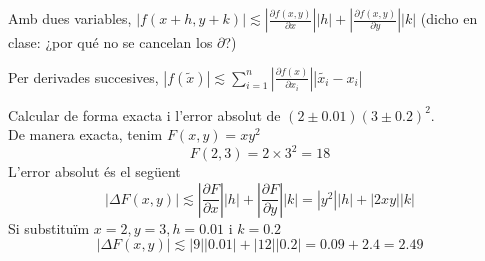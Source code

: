 \documentclass[../main.tex]{subfiles}
\begin{document}
    \begin{definicio}
        Amb dues variables, $\left\lvert f(x+h, y+k) \right\rvert \lesssim \left\lvert \frac{\partial f\left( x,y \right)}{\partial x} \right\rvert\left\lvert h \right\rvert + \left\lvert \frac{\partial f\left( x,y \right)}{\partial y} \right\rvert\left\lvert k \right\rvert$
        (dicho en clase: ¿por qué no se cancelan los $\partial$?)
    \end{definicio}
    \begin{definicio}
        Per derivades succesives, $\left\lvert f(\tilde{x}) \right\rvert \lesssim \sum\limits_{i=1}^n\left\lvert \frac{\partial f\left( x \right)}{\partial x_i} \right\rvert\left\lvert \tilde{x_i}-x_i \right\rvert$
    \end{definicio}
    \begin{exercici}
        Calcular de forma exacta i l'error absolut de $(2\pm 0.01)(3\pm 0.2)^2$.\\
        De manera exacta, tenim $F\left( x,y \right) = xy^2$
        \begin{displaymath}
            F\left( 2, 3 \right) = 2\times3^2 = 18
        \end{displaymath}
        L'error absolut és el següent
        \begin{displaymath}
            \left\lvert \Delta F\left( x,y \right) \right\rvert \lesssim \left\lvert \frac{\partial F}{\partial x} \right\rvert\left\lvert h \right\rvert +  \left\lvert \frac{\partial F}{\partial y} \right\rvert\left\lvert k \right\rvert = \left\lvert y^2 \right\rvert\left\lvert h \right\rvert + \left\lvert 2xy \right\rvert\left\lvert k \right\rvert
        \end{displaymath}
        Si substituïm $x = 2, y = 3, h = 0.01$ i $k = 0.2$
        \begin{displaymath}
            \left\lvert \Delta F\left( x,y \right) \right\rvert \lesssim \left\lvert 9 \right\rvert\left\lvert 0.01 \right\rvert + \left\lvert 12 \right\rvert\left\lvert 0.2 \right\rvert = 0.09+2.4 = 2.49
        \end{displaymath}
    \end{exercici}
\end{document}
